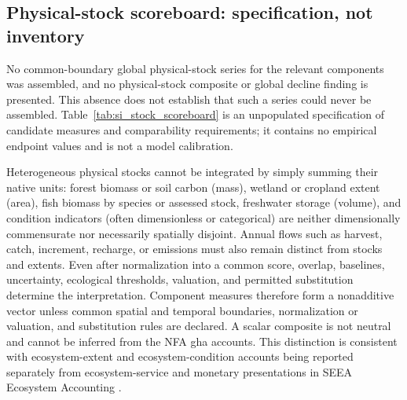 \documentclass[11pt,a4paper]{article}
\begin{document}
\subsection{Physical-stock scoreboard: specification, not inventory}\label{si:stocks}

No common-boundary global physical-stock series for the relevant components was assembled, and no physical-stock composite or global decline finding is presented. This absence does not establish that such a series could never be assembled. Table~\ref{tab:si_stock_scoreboard} is an unpopulated specification of candidate measures and comparability requirements; it contains no empirical endpoint values and is not a model calibration.

Heterogeneous physical stocks cannot be integrated by simply summing their native units: forest biomass or soil carbon (mass), wetland or cropland extent (area), fish biomass by species or assessed stock, freshwater storage (volume), and condition indicators (often dimensionless or categorical) are neither dimensionally commensurate nor necessarily spatially disjoint. Annual flows such as harvest, catch, increment, recharge, or emissions must also remain distinct from stocks and extents. Even after normalization into a common score, overlap, baselines, uncertainty, ecological thresholds, valuation, and permitted substitution determine the interpretation. Component measures therefore form a nonadditive vector unless common spatial and temporal boundaries, normalization or valuation, and substitution rules are declared. A scalar composite is not neutral and cannot be inferred from the NFA gha accounts. This distinction is consistent with ecosystem-extent and ecosystem-condition accounts being reported separately from ecosystem-service and monetary presentations in SEEA Ecosystem Accounting \citep{UN2021SEEA_EA}.
\end{document}
